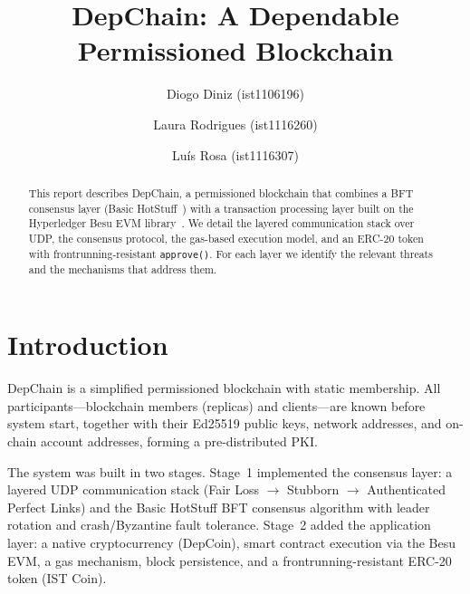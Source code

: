 \documentclass{llncs}
\begin{document}
\raggedbottom

\title{DepChain: A Dependable Permissioned Blockchain}

\author{Diogo Diniz (ist1106196) \and Laura Rodrigues (ist1116260) \and Luís Rosa (ist1116307)}


\maketitle

\begin{abstract}
This report describes DepChain, a permissioned blockchain that combines a BFT consensus layer (Basic HotStuff~\cite{hotstuff}) with a transaction processing layer built on the Hyperledger Besu EVM library~\cite{besu}. We detail the layered communication stack over UDP, the consensus protocol, the gas-based execution model, and an ERC-20 token with frontrunning-resistant \texttt{approve()}. For each layer we identify the relevant threats and the mechanisms that address them.
\end{abstract}


\section{Introduction}

DepChain is a simplified permissioned blockchain with static membership. All participants---blockchain members (replicas) and clients---are known before system start, together with their Ed25519 public keys, network addresses, and on-chain account addresses, forming a pre-distributed PKI.

The system was built in two stages. Stage~1 implemented the consensus layer: a layered UDP communication stack (Fair Loss $\to$ Stubborn $\to$ Authenticated Perfect Links) and the Basic HotStuff BFT consensus algorithm with leader rotation and crash/Byzantine fault tolerance. Stage~2 added the application layer: a native cryptocurrency (DepCoin), smart contract execution via the Besu EVM, a gas mechanism, block persistence, and a frontrunning-resistant ERC-20 token (IST Coin).
\end{document}
